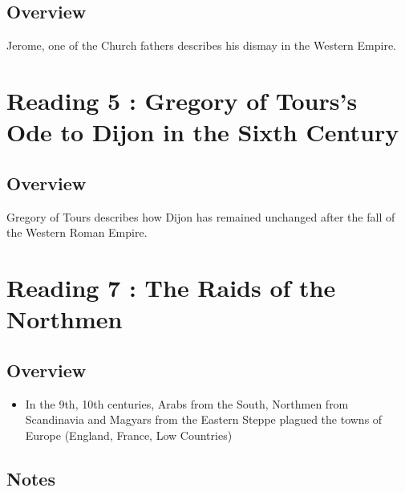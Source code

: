 \documentclass[12pt]{article}
\begin{document}
\subsection*{Overview}

Jerome, one of the Church fathers describes his dismay in the Western Empire.\\

\section*{Reading 5 : Gregory of Tours's Ode to Dijon in the Sixth Century}

\subsection*{Overview}

Gregory of Tours describes how Dijon has remained unchanged after the fall of the Western Roman Empire.\\

\section*{Reading 7 : The Raids of the Northmen}

\subsection*{Overview}
\begin{itemize}
	\item In the 9th, 10th centuries, Arabs from the South, Northmen from Scandinavia and Magyars from the Eastern Steppe plagued the towns of Europe (England, France, Low Countries)
\end{itemize}

\subsection*{Notes}
\end{document}
